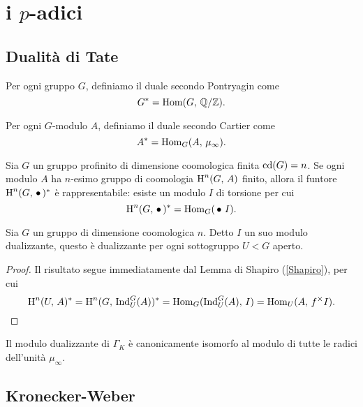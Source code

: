 \chapter{i $ p $-adici}


\section{Dualità di Tate}

\begin{definition}
	Per ogni gruppo $ G $, definiamo il duale secondo Pontryagin come
	\[ G^* = \operatorname{Hom}(G, \, \mathbb{Q}/\mathbb{Z}). \]
\end{definition}

\begin{definition}
	Per ogni $ G $-modulo $ A $, definiamo il duale secondo Cartier come
	\[ A^* = \operatorname{Hom}_G(A, \, \mu_\infty). \]
\end{definition}

\begin{proposition}
	Sia $ G $ un gruppo profinito di dimensione coomologica finita $ \operatorname{cd}(G) = n $. Se ogni modulo $ A $ ha $ n $-esimo gruppo di coomologia $ \operatorname{H}^n(G, \, A) $ finito, allora il funtore $ \operatorname{H}^n(G,\, \bullet\,)^* $ è rappresentabile: esiste un modulo $ I $ di torsione per cui
	\[ \operatorname{H}^n(G, \, \bullet \, )^* = \operatorname{Hom}_G(\,\bullet\, \, I). \]
\end{proposition}

\begin{lemma}
	Sia $ G $ un gruppo di dimensione coomologica $ n $. Detto $ I $ un suo modulo dualizzante, questo è dualizzante per ogni sottogruppo $ U < G $ aperto.
\end{lemma}
\begin{proof}
	Il risultato segue immediatamente dal Lemma di Shapiro (\ref{Shapiro}), per cui
	\[ \operatorname{H}^n(U, \, A)^* = \operatorname{H}^n(G, \, \operatorname{Ind}_U^G(A))^* = \operatorname{Hom}_G(\operatorname{Ind}_U^G(A), \, I) = \operatorname{Hom}_U(A, \, f^\times I). \]
\end{proof}

\begin{proposition}
	Il modulo dualizzante di $ \Gamma_K $ è canonicamente isomorfo al modulo di tutte le radici dell'unità $ \mu_\infty $.
\end{proposition}

\begin{theorem}
	
\end{theorem}


\section{Kronecker-Weber}
